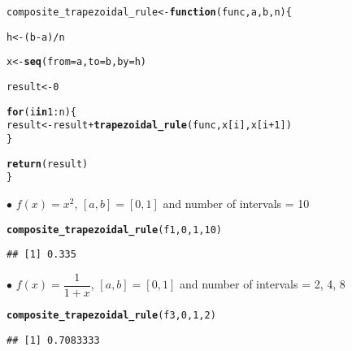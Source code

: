 \documentclass[11pt, a4paper]{article}\usepackage[]{graphicx}\usepackage[]{xcolor}
\makeatletter
\newcommand{\hlnum}[1]{\textcolor[rgb]{0.686,0.059,0.569}{#1}}%
\newcommand{\hlopt}[1]{\textcolor[rgb]{0,0,0}{#1}}%
\newcommand{\hldef}[1]{\textcolor[rgb]{0.345,0.345,0.345}{#1}}%
\newcommand{\hlkwa}[1]{\textcolor[rgb]{0.161,0.373,0.58}{\textbf{#1}}}%
\newcommand{\hlkwb}[1]{\textcolor[rgb]{0.69,0.353,0.396}{#1}}%
\newcommand{\hlkwc}[1]{\textcolor[rgb]{0.333,0.667,0.333}{#1}}%
\newcommand{\hlkwd}[1]{\textcolor[rgb]{0.737,0.353,0.396}{\textbf{#1}}}%
\newenvironment{kframe}{%
 \def\at@end@of@kframe{}%
 \ifinner\ifhmode%
  \def\at@end@of@kframe{\end{minipage}}%
  \begin{minipage}{\columnwidth}%
 \fi\fi%
 \def\FrameCommand##1{\hskip\@totalleftmargin \hskip-\fboxsep
 \colorbox{shadecolor}{##1}\hskip-\fboxsep
     \hskip-\linewidth \hskip-\@totalleftmargin \hskip\columnwidth}%
 \MakeFramed {\advance\hsize-\width
   \@totalleftmargin\z@ \linewidth\hsize
   \@setminipage}}%
 {\par\unskip\endMakeFramed%
 \at@end@of@kframe}
\newenvironment{knitrout}{}{} %
\makeatother
\begin{document}
\begin{knitrout}
\color{fgcolor}\begin{kframe}
\begin{alltt}
\hldef{composite_trapezoidal_rule} \hlkwb{<-} \hlkwa{function}\hldef{(}\hlkwc{func}\hldef{,} \hlkwc{a}\hldef{,} \hlkwc{b}\hldef{,} \hlkwc{n}\hldef{)\{}

  \hldef{h} \hlkwb{<-} \hldef{(b} \hlopt{-} \hldef{a)} \hlopt{/} \hldef{n}

  \hldef{x} \hlkwb{<-} \hlkwd{seq}\hldef{(}\hlkwc{from} \hldef{= a,} \hlkwc{to} \hldef{= b,} \hlkwc{by} \hldef{= h)}

  \hldef{result} \hlkwb{<-} \hlnum{0}

  \hlkwa{for} \hldef{(i} \hlkwa{in} \hlnum{1}\hlopt{:}\hldef{n) \{}
    \hldef{result} \hlkwb{<-} \hldef{result} \hlopt{+} \hlkwd{trapezoidal_rule}\hldef{(func, x[i], x[i}\hlopt{+}\hlnum{1}\hldef{])}
  \hldef{\}}

  \hlkwd{return}\hldef{(result)}
\hldef{\}}
\end{alltt}
\end{kframe}
\end{knitrout}

$\bullet$ $f(x) = x^2$, $[a, b] = [0, 1]$ and number of intervals = 10

\begin{knitrout}
\color{fgcolor}\begin{kframe}
\begin{alltt}
\hlkwd{composite_trapezoidal_rule}\hldef{(f1,} \hlnum{0}\hldef{,} \hlnum{1}\hldef{,} \hlnum{10}\hldef{)}
\end{alltt}
\begin{verbatim}
## [1] 0.335
\end{verbatim}
\end{kframe}
\end{knitrout}

$\bullet$ $f(x) = \dfrac{1}{1 + x}$, $[a, b] = [0, 1]$ and number of intervals = 2, 4, 8

\begin{knitrout}
\color{fgcolor}\begin{kframe}
\begin{alltt}
\hlkwd{composite_trapezoidal_rule}\hldef{(f3,} \hlnum{0}\hldef{,} \hlnum{1}\hldef{,} \hlnum{2}\hldef{)}
\end{alltt}
\begin{verbatim}
## [1] 0.7083333
\end{verbatim}
\end{kframe}
\end{knitrout}
\end{document}
